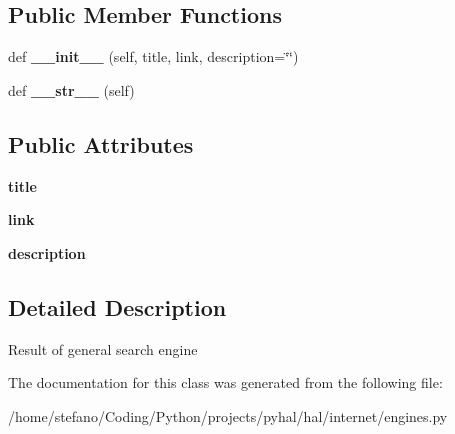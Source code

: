 \subsection*{Public Member Functions}
\begin{DoxyCompactItemize}
\item 
def {\bfseries \+\_\+\+\_\+init\+\_\+\+\_\+} (self, title, link, description=\char`\"{}\char`\"{})\hypertarget{classhal_1_1internet_1_1engines_1_1_search_engine_result_aafeb2e635cb5a9b381d5535c714d11c2}{}\label{classhal_1_1internet_1_1engines_1_1_search_engine_result_aafeb2e635cb5a9b381d5535c714d11c2}

\item 
def {\bfseries \+\_\+\+\_\+str\+\_\+\+\_\+} (self)\hypertarget{classhal_1_1internet_1_1engines_1_1_search_engine_result_aa65111d2c02c5e1d9d2b135d60eaeeac}{}\label{classhal_1_1internet_1_1engines_1_1_search_engine_result_aa65111d2c02c5e1d9d2b135d60eaeeac}

\end{DoxyCompactItemize}
\subsection*{Public Attributes}
\begin{DoxyCompactItemize}
\item 
{\bfseries title}\hypertarget{classhal_1_1internet_1_1engines_1_1_search_engine_result_ad5bf472925c771cddddc1ec8008cc6b2}{}\label{classhal_1_1internet_1_1engines_1_1_search_engine_result_ad5bf472925c771cddddc1ec8008cc6b2}

\item 
{\bfseries link}\hypertarget{classhal_1_1internet_1_1engines_1_1_search_engine_result_a87fd88d4579dd7be2fed559386cc58e8}{}\label{classhal_1_1internet_1_1engines_1_1_search_engine_result_a87fd88d4579dd7be2fed559386cc58e8}

\item 
{\bfseries description}\hypertarget{classhal_1_1internet_1_1engines_1_1_search_engine_result_a055578b70da89ea3248abb6aa27d92df}{}\label{classhal_1_1internet_1_1engines_1_1_search_engine_result_a055578b70da89ea3248abb6aa27d92df}

\end{DoxyCompactItemize}


\subsection{Detailed Description}
\begin{DoxyVerb}Result of general search engine \end{DoxyVerb}
 

The documentation for this class was generated from the following file\+:\begin{DoxyCompactItemize}
\item 
/home/stefano/\+Coding/\+Python/projects/pyhal/hal/internet/engines.\+py\end{DoxyCompactItemize}
